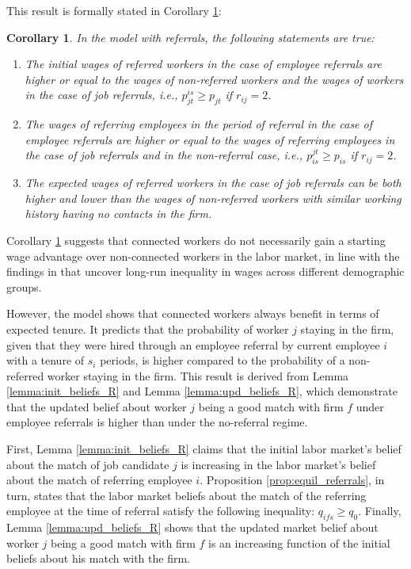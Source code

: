 \documentclass[12pt]{article}
\newtheorem{corollary}[theorem]{Corollary}
\begin{document}
This result is formally stated in Corollary \ref{cor:referrals_wages}:
\begin{corollary}\label{cor:referrals_wages}
In the model with referrals, the following statements are true:
    \begin{enumerate}[label={\roman*})]
        \item The initial wages of referred workers in the case of employee referrals are higher or equal to the wages of non-referred workers and the wages of workers in the case of job referrals, i.e., $p_{jt}^{is} \geq p_{jt}$ if $r_{ij} = 2$.
        \item The wages of referring employees in the period of referral in the case of employee referrals are higher or equal to the wages of referring employees in the case of job referrals and in the non-referral case, i.e., $p_{is}^{jt} \geq p_{is}$ if $r_{ij} = 2$.
        \item The expected wages of referred workers in the case of job referrals can be both higher and lower than the wages of non-referred workers with similar working history having no contacts in the firm.
    \end{enumerate}
\end{corollary}

Corollary \ref{cor:referrals_wages} suggests that connected workers do not necessarily gain a starting wage advantage over non-connected workers in the labor market, in line with the findings in \cite{calvo2004effects} that uncover long-run inequality in wages across different demographic groups.

However, the model shows that connected workers always benefit in terms of expected tenure. It predicts that the probability of worker $j$ staying in the firm, given that they were hired through an employee referral by current employee $i$ with a tenure of $s_i$ periods, is higher compared to the probability of a non-referred worker staying in the firm. This result is derived from Lemma \ref{lemma:init_beliefs_R} and Lemma \ref{lemma:upd_beliefs_R}, which demonstrate that the updated belief about worker $j$ being a good match with firm $f$ under employee referrals is higher than under the no-referral regime.

First, Lemma \ref{lemma:init_beliefs_R} claims that the initial labor market's belief about the match of job candidate $j$ is increasing in the labor market's belief about the match of referring employee $i$. Proposition \ref{prop:equil_referrals}, in turn, states that the labor market beliefs about the match of the referring employee at the time of referral satisfy the following inequality: $q_{ifs} \geq q_0$. Finally, Lemma \ref{lemma:upd_beliefs_R} shows that the updated market belief about worker $j$ being a good match with firm $f$ is an increasing function of the initial beliefs about his match with the firm.
\end{document}
